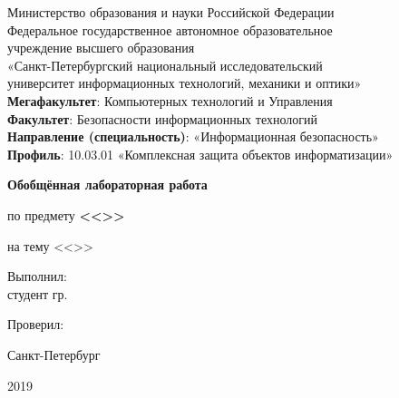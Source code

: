\thispagestyle{empty}
\large{

\begin{center}

			Министерство образования и науки Российской Федерации\\
			Федеральное государственное автономное образовательное\\
			учреждение высшего образования\\
			«Санкт-Петербургский национальный исследовательский\\
			университет информационных технологий, механики и оптики»\\
			\textbf{Мегафакультет}:  Компьютерных технологий и Управления\\
			\textbf{Факультет}: Безопасности информационных технологий\\
			\textbf{Направление (специальность)}: «Информационная безопасность»\\
			\textbf{Профиль}: 10.03.01 «Комплексная защита объектов информатизации»
\end{center}


\vfill

\begin{center}
	\textbf{Обобщённая лабораторная работа}
	
	по предмету \textbf{<<\Subject>>}
	
	на тему <<\Theme>>
\end{center}

\vfill

\begin{flushright}
	Выполнил:\\
	студент гр. \Group \\
	\FullName
	
	
	Проверил:\\
	\Teacher
\end{flushright}}

\vfill


\begin{center}
	Санкт-Петербург
	
	2019
\end{center}